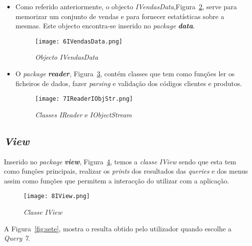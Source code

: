 \documentclass{article}
\begin{document}
\begin{itemize}
\begin{figure}[H]
\texttt{[image: 5IFiliais.png]}
\centering
\caption{\textit{Classe IFiliais}\label{fig:fil}}
\end{figure}

Definiu-se filial como sendo um catálogo especial de clientes, onde cada cliente tem  um objecto \textit{IVendasData}, Figura~\ref{fig:VD}, este objecto tem como objectivo memorizar todas as compras efectuadas por um cliente.

\item Como referido anteriormente, o objecto \textit{IVendasData},Figura~\ref{fig:VD}, serve para memorizar um conjunto de vendas e para fornecer estatísticas sobre a mesmas. Este objecto encontra-se inserido no \textit{package} \textbf{\textit{data}}.

\begin{figure}[H]
\texttt{[image: 6IVendasData.png]}
\centering
\caption{\textit{Objecto IVendasData}\label{fig:VD}}
\end{figure}

\item O \textit{package} \textbf{\textit{reader}}, Figura~\ref{fig:reader}, contém classes que tem como funções ler os ficheiros de dados, fazer \textit{parsing} e validação dos códigos clientes e produtos.

\begin{figure}[H]
\texttt{[image: 7IReaderIObjStr.png]}
\centering
\caption{\textit{Classes IReader} e \textit{IObjectStream}\label{fig:reader}}
\end{figure}


\end{itemize}

\subsection{\textit{View}}
Inserido no \textit{package} \textbf{\textit{view}}, Figura~\ref{fig:view}, temos a \textit{classe IView} sendo que esta tem como funções principais, realizar os \textit{prints} dos resultados das \textit{queries} e dos menus assim como funções que permitem a interacção do utilizar com a aplicação.


\begin{figure}[H]
\texttt{[image: 8IView.png]}
\centering
\caption{\textit{Classe IView}\label{fig:view}}
\end{figure}


A Figura~\ref{fig:sete}, mostra o resulta obtido pelo utilizador quando escolhe a \textit{Query 7}.
\end{document}
